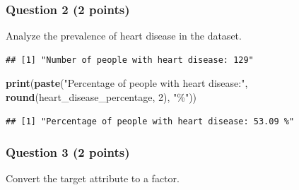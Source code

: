 \documentclass[
]{article}
\newenvironment{Shaded}{\begin{snugshade}}{\end{snugshade}}
\newcommand{\AttributeTok}[1]{\textcolor[rgb]{0.13,0.29,0.53}{#1}}
\newcommand{\DecValTok}[1]{\textcolor[rgb]{0.00,0.00,0.81}{#1}}
\newcommand{\FunctionTok}[1]{\textcolor[rgb]{0.13,0.29,0.53}{\textbf{#1}}}
\newcommand{\NormalTok}[1]{#1}
\newcommand{\OtherTok}[1]{\textcolor[rgb]{0.56,0.35,0.01}{#1}}
\newcommand{\SpecialCharTok}[1]{\textcolor[rgb]{0.81,0.36,0.00}{\textbf{#1}}}
\newcommand{\StringTok}[1]{\textcolor[rgb]{0.31,0.60,0.02}{#1}}
\begin{document}
\subsubsection{Question 2 (2 points)}\label{question-2-2-points}

Analyze the prevalence of heart disease in the dataset.

\begin{Shaded}
\end{Shaded}

\begin{verbatim}
## [1] "Number of people with heart disease: 129"
\end{verbatim}

\begin{Shaded}
\begin{Highlighting}[]
\FunctionTok{print}\NormalTok{(}\FunctionTok{paste}\NormalTok{(}\StringTok{"Percentage of people with heart disease:"}\NormalTok{, }\FunctionTok{round}\NormalTok{(heart\_disease\_percentage, }\DecValTok{2}\NormalTok{), }\StringTok{"\%"}\NormalTok{))}
\end{Highlighting}
\end{Shaded}

\begin{verbatim}
## [1] "Percentage of people with heart disease: 53.09 %"
\end{verbatim}

\subsubsection{Question 3 (2 points)}\label{question-3-2-points}

Convert the target attribute to a factor.

\begin{Shaded}
\end{Shaded}
\end{document}
